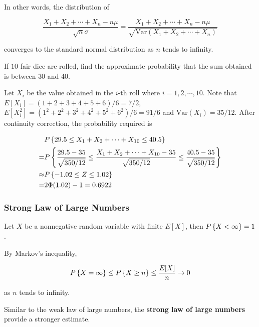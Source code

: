 \documentclass[a4paper,12pt]{article}
\begin{document}
In other words, the distribution of

$$\frac{X_{1}+X_{2}+\cdots+X_{n}-n\mu}{\sqrt{n}\sigma}=\frac{X_{1}+X_{2}+\cdots+X_{n}-n\mu}{\sqrt{\mathrm{Var}(X_{1}+X_{2}+\cdots+X_{n})}}$$\s

converges to the standard normal distribution as $n$ tends to infinity.\n

\begin{exm}
  If $10$ fair dice are rolled, find the approximate probability that the sum obtained is between $30$ and $40$.\n

  \ans Let $X_{i}$ be the value obtained in the $i$-th roll where $i=1,2,\cdots,10$. Note that $E[X_{i}]=(1+2+3+4+5+6)/6=7/2$, $E[X_{i}^{2}]=(1^{2}+2^{2}+3^{2}+4^{2}+5^{2}+6^{2})/6=91/6$ and $\mathrm{Var}(X_{i})=35/12$. After continuity correction, the probability required is

  $$\begin{aligned}[t]
    &P\left\{ 29.5\leq X_{1}+X_{2}+\cdots+X_{10}\leq 40.5\right\}\\
    =&P\left\{ \frac{29.5-35}{\sqrt{350/12}}\leq\frac{X_{1}+X_{2}+\cdots+X_{10}-35}{\sqrt{350/12}}\leq\frac{40.5-35}{\sqrt{350/12}}\right\}\\
    \approx&P\left\{ -1.02\leq Z\leq 1.02\right\}\\
    =&2\Phi(1.02)-1=0.6922
  \end{aligned}$$
\end{exm}

\subsubsection{Strong Law of Large Numbers}
\begin{pst}
  Let $X$ be a nonnegative random variable with finite $E[X]$, then $P\left\{ X<\infty\right\}=1$.\n

  \prf By Markov's inequality,

  $$P\left\{ X=\infty\right\}\leq P\left\{ X\geq n\right\}\leq\frac{E[X]}{n}\to 0$$\s

  as $n$ tends to infinity.
\end{pst}

Similar to the weak law of large numbers, the \textbf{strong law of large numbers} provide a stronger estimate.\n
\end{document}
